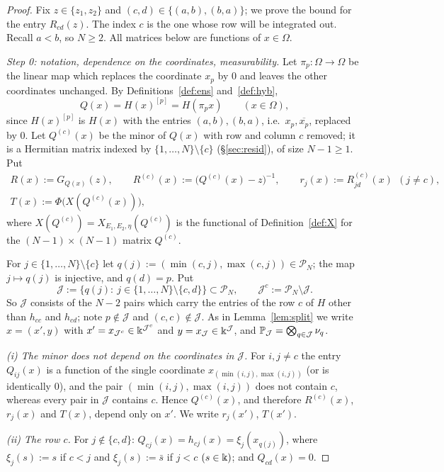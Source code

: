 \begin{proof}
Fix $z\in\{z_1,z_2\}$ and $(c,d)\in\{(a,b),(b,a)\}$; we prove the bound for the entry $R_{cd}(z)$. The index $c$ is the one whose row will be integrated out. Recall $a<b$, so
$N\ge2$. All matrices below are functions of $x\in\Omega$.

\smallskip\noindent\emph{Step 0: notation, dependence on the coordinates, measurability.}
Let $\pi_p:\Omega\to\Omega$ be the linear map which replaces the coordinate $x_p$ by $0$ and leaves the other coordinates unchanged. By Definitions~\ref{def:ens} and~\ref{def:hyb},
\[
Q(x)=H(x)^{[p]}=H(\pi_px)\qquad(x\in\Omega),
\]
since $H(x)^{[p]}$ is $H(x)$ with the entries $(a,b),(b,a)$, i.e.\ $x_p,\overline{x_p}$, replaced by $0$. Let $Q^{(c)}(x)$ be the minor of $Q(x)$ with row and column $c$ removed; it is a
Hermitian matrix indexed by $\{1,\dots,N\}\setminus\{c\}$ (\S\ref{sec:resid}), of size $N-1\ge1$. Put
\begin{gather*}
R(x):=G_{Q(x)}(z),\qquad R^{(c)}(x):=\big(Q^{(c)}(x)-z\big)^{-1},\qquad r_j(x):=R^{(c)}_{jd}(x)\ \ (j\ne c),\\
T(x):=\Phi\big(X(Q^{(c)}(x))\big),
\end{gather*}
where $X(Q^{(c)})=X_{E_1,E_2,\eta}(Q^{(c)})$ is the functional of Definition~\ref{def:X} for the $(N-1)\times(N-1)$ matrix $Q^{(c)}$.

For $j\in\{1,\dots,N\}\setminus\{c\}$ let $q(j):=(\min(c,j),\max(c,j))\in\mathcal P_N$; the map $j\mapsto q(j)$ is injective, and $q(d)=p$. Put
\[
\mathcal J:=\big\{q(j):\ j\in\{1,\dots,N\}\setminus\{c,d\}\big\}\subset\mathcal P_N,\qquad\mathcal J^c:=\mathcal P_N\setminus\mathcal J .
\]
So $\mathcal J$ consists of the $N-2$ pairs which carry the entries of the row $c$ of $H$ other than $h_{cc}$ and $h_{cd}$; note $p\notin\mathcal J$ and $(c,c)\notin\mathcal J$.
As in Lemma~\ref{lem:split} we write $x=(x',y)$ with $x'=x_{\mathcal J^c}\in\K^{\mathcal J^c}$ and $y=x_{\mathcal J}\in\K^{\mathcal J}$, and $\P_{\mathcal J}=\bigotimes_{q\in\mathcal J}\nu_q$.

\emph{\textup{(i)} The minor does not depend on the coordinates in $\mathcal J$.} For $i,j\ne c$ the entry $Q_{ij}(x)$ is a function of the single coordinate $x_{(\min(i,j),\max(i,j))}$ (or is identically $0$),
and the pair $(\min(i,j),\max(i,j))$ does not contain $c$, whereas every pair in $\mathcal J$ contains $c$. Hence $Q^{(c)}(x)$, and therefore $R^{(c)}(x)$, $r_j(x)$ and $T(x)$, depend only on $x'$.
We write $r_j(x')$, $T(x')$.

\emph{\textup{(ii)} The row $c$.} For $j\notin\{c,d\}$: $Q_{cj}(x)=h_{cj}(x)=\xi_j(x_{q(j)})$, where $\xi_j(s):=s$ if $c<j$ and $\xi_j(s):=\bar s$ if $j<c$ $(s\in\K)$; and $Q_{cd}(x)=0$.


\end{proof}
